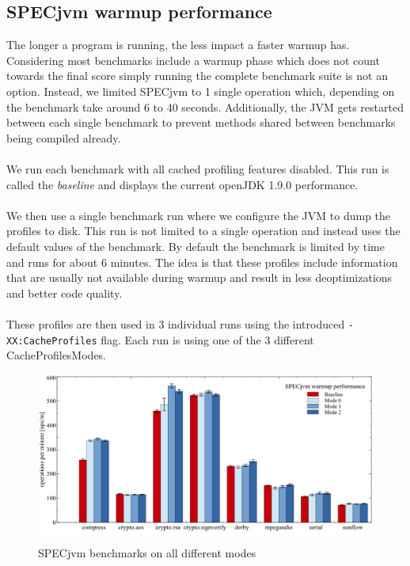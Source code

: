 \subsection{SPECjvm warmup performance}
\label{s:perf_specjvm_warmup}
The longer a program is running, the less impact a faster warmup has.  Considering most benchmarks include a warmup phase which does not count towards the final score simply running the complete benchmark suite is not an option.
Instead, we limited SPECjvm to 1 single operation which, depending on the benchmark take around 6 to 40 seconds.
Additionally, the JVM gets restarted between each single benchmark to prevent methods shared between benchmarks being compiled already.
\\\\
We run each benchmark with all cached profiling features disabled. This run is called the \textit{baseline} and displays the current openJDK 1.9.0 performance.    
\\\\ 
We then use a single benchmark run where we configure the JVM to dump the profiles to disk. This run is not limited to a single operation and instead uses the default values of the benchmark. By default the benchmark is limited by time and runs for about 6 minutes. The idea is that these profiles include information that are usually not available during warmup and result in less deoptimizations and better code quality.
\\\\
These profiles are then used in 3 individual runs using the introduced \texttt{-XX:CacheProfiles} flag. Each run is using one of the 3 different CacheProfilesModes.
\begin{figure}[ht]
  \begin{center}
    \centering
    \includegraphics[width=1.0\textwidth]{figures/others_warmup.png}
    \caption{SPECjvm benchmarks on all different modes}
    \label{f:others_warmup}
  \end{center}
\end{figure}
